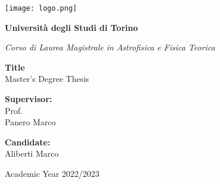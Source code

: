 \thispagestyle{empty}
\begin{center}
    \texttt{[image: logo.png]}
    \vspace{0.5cm}\\
    {\LARGE\bfseries Università degli Studi di Torino \par}
	\vspace{0,3cm}
	{\Large\it Corso di Laurea Magistrale in Astrofisica e Fisica Teorica\par}
    \vspace{2cm}
	{\LARGE\bfseries Title}
	\vspace{0.3cm}\\
    {\Large Master's Degree Thesis}
	\vspace{0,5cm}
\end{center}
\vspace{2cm}
\begin{minipage}[t]{0.4\textwidth} %
    {\large{{\bf Supervisor:}\\
        Prof.\\
        Panero Marco}}
\end{minipage}
\hfill
\begin{minipage}[t]{0.47\textwidth}\raggedleft %
    {\large{{\bf Candidate:}\\
        Aliberti Marco}}
    \vspace{12mm}
\end{minipage}
\hfill
\vspace{18mm}
\begin{center} %
    \large{Academic Year 2022/2023}
\end{center} 
